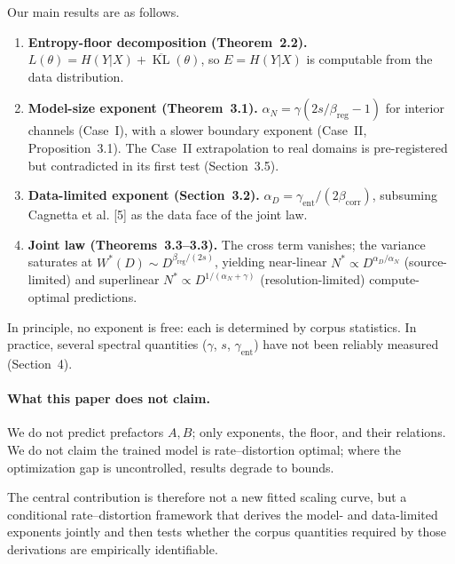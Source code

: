 \documentclass[entropy,article,submit,moreauthors,pdftex]{mdpi}
\newcommand{\KL}{\operatorname{KL}}
\begin{document}
Our main results are as follows.
\begin{enumerate}[label=\textbf{(\arabic*)}]
\item \textbf{Entropy-floor decomposition (Theorem~2.2).}
  $L(\theta) = H(Y|X) + \overline{\KL}(\theta)$,
  so $E=H(Y|X)$ is computable from the data distribution.

\item \textbf{Model-size exponent (Theorem~3.1).}
  $\alpha_N = \gamma(2s/\beta_{\mathrm{reg}}-1)$ for interior channels (Case~I),
  with a slower boundary exponent (Case~II, Proposition~3.1).
  The Case~II extrapolation to real domains is pre-registered but contradicted
  in its first test (Section~3.5).

\item \textbf{Data-limited exponent (Section~3.2).}
  $\alpha_D = \gamma_{\mathrm{ent}}/(2\beta_{\mathrm{corr}})$, subsuming
  Cagnetta et al. [5] as the data face of the joint law.

\item \textbf{Joint law (Theorems~3.3--3.3).}
  The cross term vanishes; the variance saturates at
  $W^*(D)\!\sim\!D^{\beta_{\mathrm{reg}}/(2s)}$, yielding near-linear
  $N^*\!\propto\!D^{\alpha_D/\alpha_N}$ (source-limited) and superlinear
  $N^*\!\propto\!D^{1/(\alpha_N+\gamma)}$ (resolution-limited)
  compute-optimal predictions.
\end{enumerate}

In principle, no exponent is free: each is determined by corpus statistics. In
practice, several spectral quantities ($\gamma$, $s$, $\gamma_{\mathrm{ent}}$) have
not been reliably measured (Section~4).

\paragraph{What this paper does not claim.}
We do not predict prefactors $A,B$; only exponents, the floor, and their
relations.  We do not claim the trained model is rate--distortion optimal; where
the optimization gap is uncontrolled, results degrade to bounds.

The central contribution is therefore not a new fitted scaling curve, but a
conditional rate--distortion framework that derives the model- and data-limited
exponents jointly and then tests whether the corpus quantities required by those
derivations are empirically identifiable.

\end{document}
